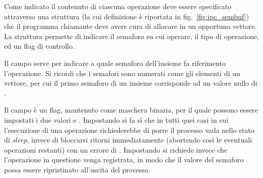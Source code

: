 Come indicato il contenuto di ciascuna operazione deve essere specificato
attraverso una struttura  (la cui definizione è riportata in
fig.~\ref{fig:ipc_sembuf}) che il programma chiamante deve avere cura di
allocare in un opportuno vettore. La struttura permette di indicare il
semaforo su cui operare, il tipo di operazione, ed un flag di controllo.  

Il campo  serve per indicare a quale semaforo dell'insieme fa
riferimento l'operazione. Si ricordi che i semafori sono numerati come gli
elementi di un vettore, per cui il primo semaforo di un insieme corrisponde ad
un valore nullo di .

Il campo  è un flag, mantenuto come maschera binaria, per il
quale possono essere impostati i due valori  e
.  Impostando  si fa sì che in tutti quei
casi in cui l'esecuzione di una operazione richiederebbe di porre il processo
vada nello stato di \textit{sleep}, invece di bloccarsi  ritorni
immediatamente (abortendo così le eventuali operazioni restanti) con un errore
di .  Impostando  si richiede invece che
l'operazione in questione venga registrata, in modo che il valore del semaforo
possa essere ripristinato all'uscita del processo.

